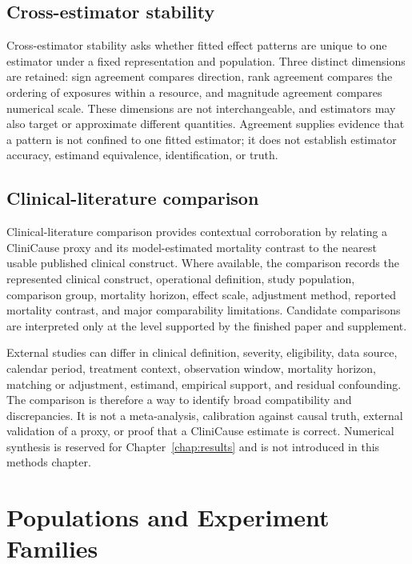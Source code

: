 \subsection{Cross-estimator stability}

Cross-estimator stability asks whether fitted effect patterns are unique to one estimator under a fixed representation and population.  Three distinct dimensions are retained: sign agreement compares direction, rank agreement compares the ordering of exposures within a resource, and magnitude agreement compares numerical scale.  These dimensions are not interchangeable, and estimators may also target or approximate different quantities.  Agreement supplies evidence that a pattern is not confined to one fitted estimator; it does not establish estimator accuracy, estimand equivalence, identification, or truth.

\subsection{Clinical-literature comparison}

Clinical-literature comparison provides contextual corroboration by relating a CliniCause proxy and its model-estimated mortality contrast to the nearest usable published clinical construct.  Where available, the comparison records the represented clinical construct, operational definition, study population, comparison group, mortality horizon, effect scale, adjustment method, reported mortality contrast, and major comparability limitations.  Candidate comparisons are interpreted only at the level supported by the finished paper and supplement.

External studies can differ in clinical definition, severity, eligibility, data source, calendar period, treatment context, observation window, mortality horizon, matching or adjustment, estimand, empirical support, and residual confounding.  The comparison is therefore a way to identify broad compatibility and discrepancies.  It is not a meta-analysis, calibration against causal truth, external validation of a proxy, or proof that a CliniCause estimate is correct.  Numerical synthesis is reserved for Chapter~\ref{chap:results} and is not introduced in this methods chapter.

\section{Populations and Experiment Families}

